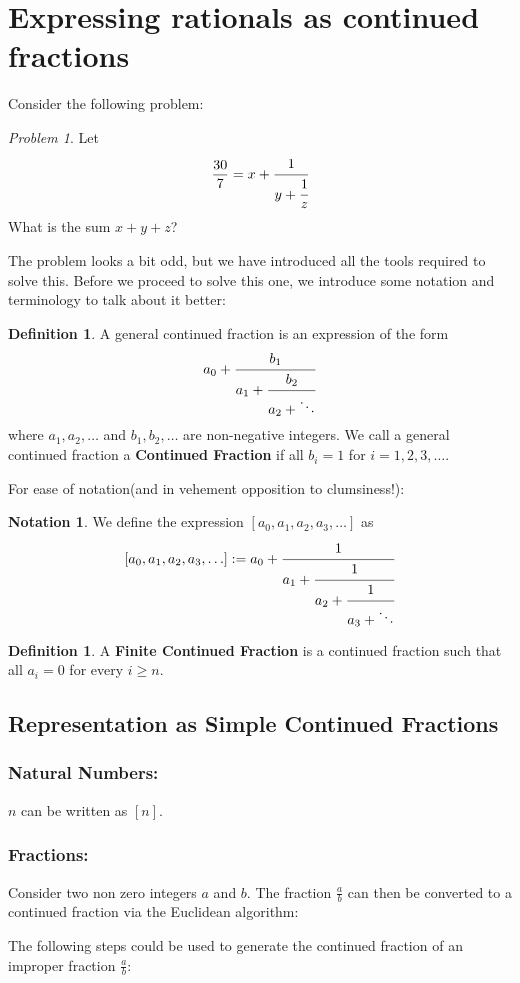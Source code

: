 \documentclass[12pt]{amsart}
\theoremstyle{definition}
\newtheorem{defn}[theorem]{Definition}
\newtheorem{nota}[theorem]{Notation}
\theoremstyle{remark}
\newtheorem{pb}[theorem]{Problem}
\numberwithin{equation}{section}
\begin{document}
\section{Expressing rationals as continued fractions}
Consider the following problem:
\begin{pb}
Let \[\frac{30}{7}=x+ \cfrac{1}{y+\cfrac{1}{z}}\]
What is the sum $x+y+z$?
\end{pb}
The problem looks a bit odd, but we have introduced all the tools required to solve this. Before we proceed to solve this one, we introduce some notation and terminology to talk about it better:
\begin{defn}
A general continued fraction is an expression of the form \[a_0+ \cfrac{b_1}{a_1+\cfrac{b_2}{a_2+\ddots}}\] where $a_1,a_2,\ldots$ and $b_1,b_2,\ldots$ are non-negative integers. We call a general continued fraction a \textbf{Continued Fraction} if all $b_i=1$ for $i=1,2,3,\ldots$. 

\end{defn}



For ease of notation(and in vehement opposition to clumsiness!):
\begin{nota} We define the expression $[a_0, a_1,a_2,a_3,\ldots]$ as  \[ [a_0, a_1,a_2,a_3,\ldots]:= a_0+ \cfrac{1}{a_1+\cfrac{1}{a_2+\cfrac{1}{a_3+\ddots}}}\]
\end{nota}
\begin{defn}
A \textbf{Finite Continued Fraction} is a continued fraction such that all $a_i=0$ for every $i\geq n$. 

\end{defn}

\subsection{Representation as Simple Continued Fractions}
\subsubsection{Natural Numbers:} $n$ can be written as $[n]$.
\subsubsection{Fractions:}
Consider two non zero integers $a$ and $b$. The fraction $\frac{a}{b}$ can then be converted to a continued fraction via the Euclidean algorithm: 

The following steps could be used to generate the continued fraction of an improper fraction $\frac{a}{b}$:
\end{document}
